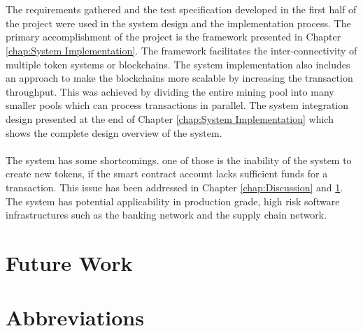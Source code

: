 \documentclass[a4paper,twoside,phd]{BYUPhys}
\begin{document}
\\
\\
The requirements gathered and the test specification developed in the first half of the project were used in the system design and the implementation process. The primary accomplishment of the project is the framework presented in Chapter \ref{chap:System Implementation}. The framework facilitates the inter-connectivity of multiple token systems or blockchains. The system implementation also includes an approach to make the blockchains more scalable by increasing the transaction throughput. This was achieved by dividing the entire mining pool into many smaller pools which can process transactions in parallel. The system integration design presented at the end of Chapter \ref{chap:System Implementation} which shows the complete design overview of the system. 
\\
\\
The system has some shortcomings. one of those is the inability of the system to create new tokens, if the smart contract account lacks sufficient funds for a transaction. This issue has been addressed in Chapter \ref{chap:Discussion} and \ref{chap:FutureWork}. The system has potential applicability in production grade, high risk software infrastructures such as the banking network and the supply chain network. 
\chapter{Future Work}
\label{chap:FutureWork}
\chapter{Abbreviations}
\label{chap:abbreviations}
\end{document}
